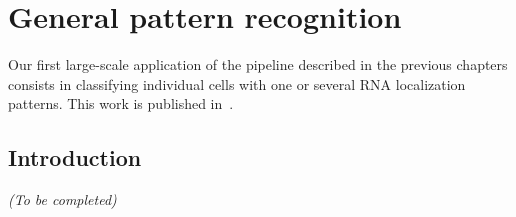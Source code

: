 \section{General pattern recognition}
\label{sec:general_pattern_recognition}

Our first large-scale application of the pipeline described in the previous chapters consists in classifying individual cells with one or several \ac{RNA} localization patterns.
This work is published in~\cite{CHOUAIB_2020}.

\subsection{Introduction}
\label{subsec:introduction_general_pattern}

\begin{center}
	\textit{(To be completed)}
\end{center}



